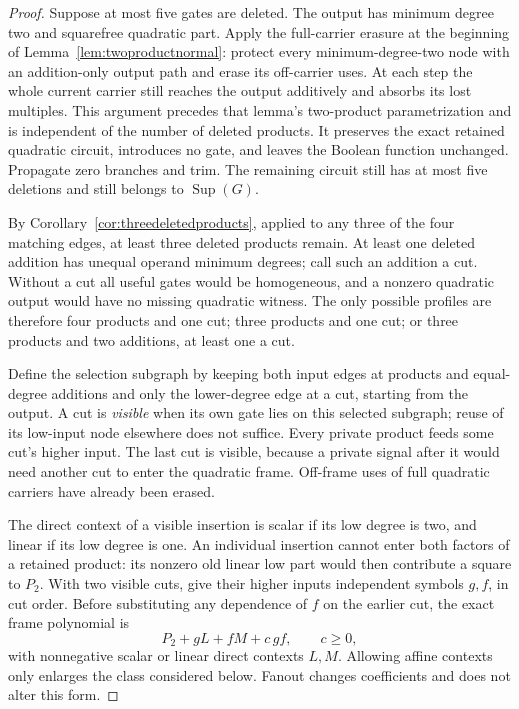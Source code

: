 \documentclass[11pt]{article}
\newcommand{\Sup}{\operatorname{Sup}}
\theoremstyle{definition}
\theoremstyle{remark}
\begin{document}
\begin{proof}
Suppose at most five gates are deleted. The output has minimum degree two and squarefree quadratic part. Apply the full-carrier erasure at the beginning of Lemma~\ref{lem:twoproductnormal}: protect every minimum-degree-two node with an addition-only output path and erase its off-carrier uses. At each step the whole current carrier still reaches the output additively and absorbs its lost multiples. This argument precedes that lemma's two-product parametrization and is independent of the number of deleted products. It preserves the exact retained quadratic circuit, introduces no gate, and leaves the Boolean function unchanged. Propagate zero branches and trim. The remaining circuit still has at most five deletions and still belongs to $\Sup(G)$.

By Corollary~\ref{cor:threedeletedproducts}, applied to any three of the four matching edges, at least three deleted products remain. At least one deleted addition has unequal operand minimum degrees; call such an addition a cut. Without a cut all useful gates would be homogeneous, and a nonzero quadratic output would have no missing quadratic witness. The only possible profiles are therefore four products and one cut; three products and one cut; or three products and two additions, at least one a cut.

Define the selection subgraph by keeping both input edges at products and equal-degree additions and only the lower-degree edge at a cut, starting from the output. A cut is \emph{visible} when its own gate lies on this selected subgraph; reuse of its low-input node elsewhere does not suffice. Every private product feeds some cut's higher input. The last cut is visible, because a private signal after it would need another cut to enter the quadratic frame. Off-frame uses of full quadratic carriers have already been erased.

The direct context of a visible insertion is scalar if its low degree is two, and linear if its low degree is one. An individual insertion cannot enter both factors of a retained product: its nonzero old linear low part would then contribute a square to $P_2$. With two visible cuts, give their higher inputs independent symbols $g,f$, in cut order. Before substituting any dependence of $f$ on the earlier cut, the exact frame polynomial is
\[
 P_2+gL+fM+c\,gf,\qquad c\ge0,
\]
with nonnegative scalar or linear direct contexts $L,M$. Allowing affine contexts only enlarges the class considered below. Fanout changes coefficients and does not alter this form.


\end{proof}
\end{document}
